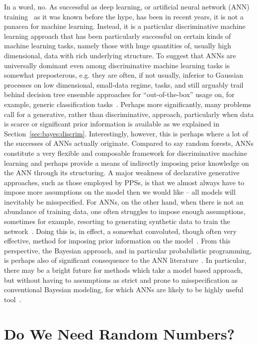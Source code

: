 In a word, no.  As successful as deep learning, or artificial neural network (ANN) training~\citep{bishop1995neural} 
as it was known before the hype,
has been in recent years, it is not a panacea for machine learning.  Instead, it is a particular discriminative
machine learning approach that has been particularly successful on certain kinds of machine learning tasks,
namely those with huge quantities of, usually high dimensional, data with rich underlying structure.   
To suggest that ANNs are universally dominant even among discriminative machine learning tasks is
somewhat preposterous, e.g. they are often, if not usually, inferior to Gaussian processes on low dimensional,
small-data regime, tasks, and still arguably trail behind decision tree ensemble approaches for ``out-of-the-box''
usage on, for example, generic classification tasks~\citep{rainforth2015canonical}.   Perhaps more significantly,
many problems call for a generative, rather than discriminative, approach,
particularly when data is scarce or significant prior information is available as we explained
in Section~\ref{sec:bayes:discrim}.  Interestingly, however, this is perhaps
where a lot of the successes of ANNs actually originate.  Compared to say random forests, ANNs constitute a very
flexible and composable framework for discriminative machine learning and perhaps provide a means of 
indirectly imposing prior knowledge on the ANN through its structuring.  A major weakness of
declarative generative approaches, such as those employed by PPSs, is that we almost
always have to impose more assumptions on the model then we would like -- all models will inevitably be
misspecified.  For ANNs, on the other hand, when there is not an abundance of training data,
one often struggles to impose enough assumptions, sometimes
for example, resorting to generating synthetic data to train the network~\citep{von2008recaptcha}.  
Doing this is, in effect, a somewhat convoluted,
though often very effective, method for imposing prior information on the model~\citep{le2017using}.  From this
perspective, the Bayesian approach, and in particular probabilistic programming, is perhaps also of significant
consequence to the ANN literature~\citep{gal2016uncertainty}.
In particular, there may be a bright future for methods which
take a model based approach, but without having to assumptions as strict and prone to misspecification
as conventional Bayesian modeling, for which ANNs are likely to be highly useful tool~\citep{siddharth2017learning}.

\section{Do We Need Random Numbers?}


